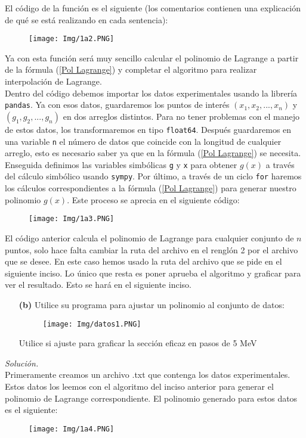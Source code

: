 \documentclass[11pt]{article}
\begin{document}
		El código de la función es el siguiente (los comentarios contienen una explicación de qué se está realizando en cada sentencia):
\newpage
		\begin{figure}[h]
			\centering
			\texttt{[image: Img/1a2.PNG]}
		\end{figure}
	
	Ya con esta función será muy sencillo calcular el polinomio de Lagrange a partir de la fórmula (\ref{Pol Lagrange}) y completar el algoritmo para realizar interpolación de Lagrange.\\
	Dentro del código debemos importar los datos experimentales usando la librería \texttt{pandas}. Ya con esos datos, guardaremos los puntos de interés $(x_1,x_2,...,x_n)$ y $(g_1,g_2,...,g_n)$ en dos arreglos distintos. Para no tener problemas con el manejo de estos datos, los transformaremos en tipo \texttt{float64}. Después guardaremos en una variable \texttt{n} el número de datos que coincide con la longitud de cualquier arreglo, esto es necesario saber ya que en la fórmula (\ref{Pol Lagrange}) se necesita. Enseguida definimos las variables simbólicas \texttt{g} y \texttt{x} para obtener $g(x)$ a través del cálculo simbólico usando \texttt{sympy}. Por último, a través de un ciclo \texttt{for} haremos los cálculos correspondientes a la fórmula (\ref{Pol Lagrange}) para generar nuestro polinomio $g(x)$. Este proceso se aprecia en el siguiente código: 
	\begin{figure}[h]
		\centering
		\texttt{[image: Img/1a3.PNG]}
	\end{figure}
	
	El código anterior calcula el polinomio de Lagrange para cualquier conjunto de $n$ puntos, solo hace falta cambiar la ruta del archivo en el renglón 2 por el archivo que se desee. En este caso hemos usado la ruta del archivo que se pide en el siguiente inciso. Lo único que resta es poner aprueba el algoritmo y graficar para ver el resultado. Esto se hará en el siguiente inciso.
	
	\begin{enumerate}
		\item [\textbf{(b)}]Utilice su programa para ajustar un polinomio al conjunto de datos:
			\begin{figure}[h]
			\centering
			\texttt{[image: Img/datos1.PNG]}
		\end{figure}
		Utilice si ajuste para graficar la sección eficaz en pasos de 5 MeV
	\end{enumerate}
	\textit{Solución.}\\
	Primeramente creamos un archivo .txt que contenga los datos experimentales. Estos datos los leemos con el algoritmo del inciso anterior para generar el polinomio de Lagrange correspondiente. El polinomio generado para estos datos es el siguiente:
	\begin{figure}[h]
		\centering
		\texttt{[image: Img/1a4.PNG]}
	\end{figure}
	
\end{document}
